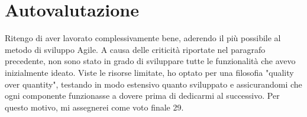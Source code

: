 \documentclass[9pt]{extarticle}
\begin{document}
\section{Autovalutazione}

Ritengo di aver lavorato complessivamente bene, aderendo il più possibile al metodo di sviluppo Agile. A causa delle criticità riportate nel paragrafo precedente, non sono stato in grado di sviluppare tutte le funzionalità che avevo inizialmente ideato. Viste le risorse limitate, ho optato per una filosofia "quality over quantity", testando in modo estensivo quanto sviluppato e assicurandomi che ogni componente funzionasse a dovere prima di dedicarmi al successivo. Per questo motivo, mi assegnerei come voto finale 29.
\end{document}
